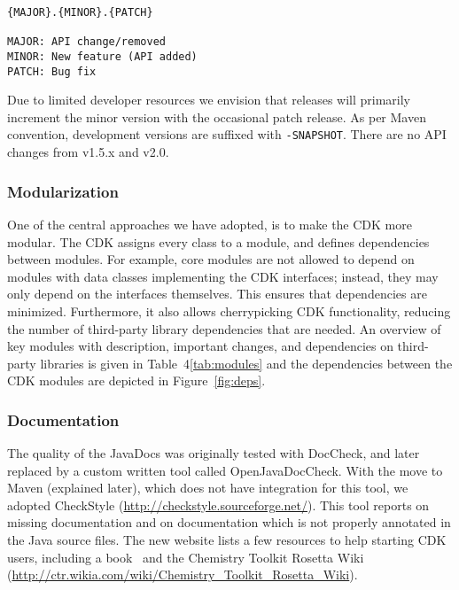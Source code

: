 \documentclass[doublespacing]{bmcart}
\def \cdkversion {v2.0}
\begin{document}
\begin{verbatim}
{MAJOR}.{MINOR}.{PATCH}

MAJOR: API change/removed
MINOR: New feature (API added)
PATCH: Bug fix
\end{verbatim}

Due to limited developer resources we envision that releases will primarily 
increment the minor version with the occasional patch release. As per Maven 
convention, development versions are suffixed with \texttt{-SNAPSHOT}. 
There are no API changes from v1.5.x and \cdkversion{}.

\subsubsection*{Modularization}

One of the central approaches we have adopted, is to make the CDK more modular. The CDK assigns
every class to a module, and defines dependencies between modules. For example, core modules
are not allowed to depend on modules with data classes implementing the CDK interfaces;
instead, they may only depend on the interfaces themselves. This ensures that
dependencies are minimized. Furthermore, it also allows cherrypicking CDK
functionality, reducing the number of third-party library dependencies that are
needed.
An overview of key modules with description, important changes, and dependencies
on third-party libraries is given in Table~4\ref{tab:modules} and the dependencies
between the CDK modules are depicted in
Figure~\ref{fig:deps}.


\subsubsection*{Documentation}

The quality of the JavaDocs was originally tested with DocCheck, and
later replaced by a custom written tool called OpenJavaDocCheck. With the move
to Maven (explained later), which does not have integration for this tool,
we adopted CheckStyle (\url{http://checkstyle.sourceforge.net/}). This tool
reports on missing documentation and on documentation which is not properly
annotated in the Java source files. The new website lists a few resources to
help starting CDK users, including a book~\cite{GroovyCDK} and the
Chemistry Toolkit Rosetta Wiki (\url{http://ctr.wikia.com/wiki/Chemistry_Toolkit_Rosetta_Wiki}).
\end{document}
